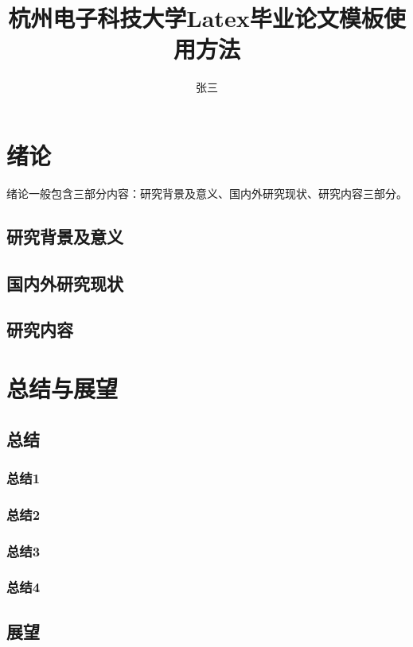 \documentclass[master,draft]{styles/hdu-thesis}
\title{杭州电子科技大学Latex毕业论文模板使用方法}{Munual of latex on thesis for HDU}
\author{张三}{San Zhang}%
\begin{document}
\makecover
\makedeclaration




\figurelist

\tablelist


\tableofcontents

\chapter{绪论}
  绪论一般包含三部分内容：研究背景及意义、国内外研究现状、研究内容三部分。
  \section{研究背景及意义}
  \section{国内外研究现状}
  \section{研究内容}

\ifdraft{
  
}{}

\chapter{总结与展望}
  \section{总结}
    \subsection{总结1}
    \subsection{总结2}
    \subsection{总结3}
    \subsection{总结4}
  \section{展望}
\end{document}
